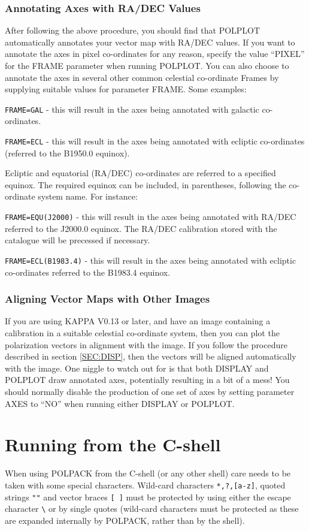 \documentclass[twoside,11pt]{article}
\newcommand{\hyperref}[4]{#2\ref{#4}#3}
\newcommand{\htmlref}[2]{#1}
\renewcommand{\_}{\texttt{\symbol{95}}}
\begin{document}
\subsubsection {Annotating Axes with RA/DEC Values}
After following the above procedure, you should find that
\htmlref{POLPLOT}{POLPLOT} automatically annotates your vector map with
RA/DEC values. If you want to annotate the axes in pixel co-ordinates for
any reason, specify the value ``PIXEL'' for the FRAME parameter when running
POLPLOT. You can also choose to annotate the axes in several other common
celestial co-ordinate Frames by supplying suitable values for parameter
FRAME. Some examples:

\verb+FRAME=GAL+ - this will result in the axes being annotated with
galactic co-ordinates.

\verb+FRAME=ECL+ - this will result in the axes being annotated with
ecliptic co-ordinates (referred to the B1950.0 equinox). 

Ecliptic and equatorial (RA/DEC) co-ordinates are referred to a specified
equinox. The required equinox can be included, in parentheses, following the
co-ordinate system name. For instance:

\verb+FRAME=EQU(J2000)+ - this will result in the axes being annotated with
RA/DEC referred to the J2000.0 equinox. The RA/DEC calibration stored
with the catalogue will be precessed if necessary.

\verb+FRAME=ECL(B1983.4)+ - this will result in the axes being annotated with
ecliptic co-ordinates referred to the B1983.4 equinox. 

\subsubsection {Aligning Vector Maps with Other Images}
If you are using KAPPA V0.13 or later, and have an image containing a 
calibration in a suitable celestial co-ordinate system, then you can plot 
the polarization vectors in alignment with the image. If you follow the 
procedure described \hyperref{here}{in section }{}{SEC:DISP}, then the
vectors will be aligned automatically with the image. One niggle to watch 
out for is that both DISPLAY and POLPLOT draw annotated axes, potentially 
resulting in a bit of a mess! You should normally disable the production of 
one set of axes by setting parameter AXES to ``NO'' when running either
DISPLAY or POLPLOT.

\section{Running from the C-shell}
When using POLPACK from the C-shell (or any other shell) care needs to be
taken with some special characters. Wild-card characters \texttt{*,?,[a-z]},
quoted strings \texttt{""} and vector braces \texttt{[ ]} must be protected
by using either the escape character {\small \verb+\+} or by single
quotes (wild-card characters must be protected as these are expanded
internally by POLPACK, rather than by the shell).
\end{document}
